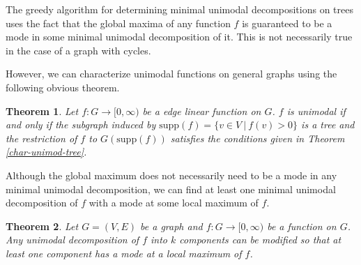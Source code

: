 \documentclass[11pt]{article}
\newtheorem{thm}{Theorem}[section]
\newcommand{\supp}{\text{supp}}
\begin{document}
The greedy algorithm for determining minimal unimodal decompositions on trees uses the fact that the global maxima of any function $f$ is guaranteed to be a mode in some minimal unimodal decomposition of it. This is not necessarily true in the case of a graph with cycles.

However, we can characterize unimodal functions on general graphs using the following obvious theorem.
\begin{thm}
\label{thm:unimod-char}
Let $f : G \rightarrow [0,\infty)$ be a edge linear function on $G$. $f$ is unimodal if and only if the subgraph induced by $\supp(f) = \{ v \in V \ | \ f(v) > 0 \}$ is a tree and the restriction of $f$ to $G(\supp(f))$ satisfies the conditions given in Theorem \ref{char-unimod-tree}.
\end{thm}

\iffalse
Although the global maximum does not necessarily need to be a mode in any minimal unimodal decomposition, we can find at least one minimal unimodal decomposition of $f$ with a mode at some local maximum of $f$.

\begin{thm}
Let $G = (V,E)$ be a graph and $f : G \rightarrow [0,\infty)$ be a function on $G$. Any unimodal decomposition of $f$ into $k$ components can be modified so that at least one component has a mode at a local maximum of $f$.
\end{thm}
\end{document}
